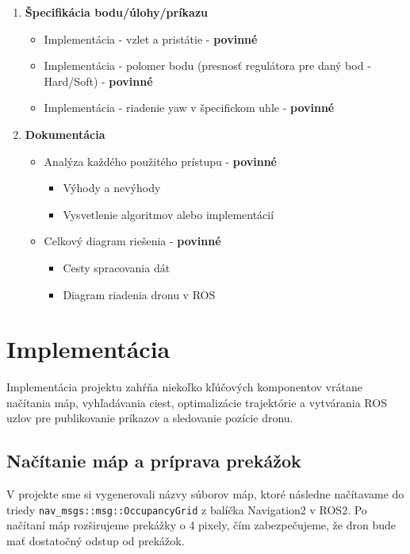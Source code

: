 \begin{enumerate}
    \item \textbf{Špecifikácia bodu/úlohy/príkazu}
    \begin{itemize}
        \item Implementácia - vzlet a pristátie - \textbf{povinné}
        \item Implementácia - polomer bodu (presnosť regulátora pre daný bod - Hard/Soft) - \textbf{povinné}
        \item Implementácia - riadenie yaw v špecifickom uhle - \textbf{povinné}
    \end{itemize}
    
    \item \textbf{Dokumentácia}
    \begin{itemize}
        \item Analýza každého použitého prístupu - \textbf{povinné}
        \begin{itemize}
            \item Výhody a nevýhody
            \item Vysvetlenie algoritmov alebo implementácií
        \end{itemize}
        \item Celkový diagram riešenia - \textbf{povinné}
        \begin{itemize}
            \item Cesty spracovania dát
            \item Diagram riadenia dronu v ROS
        \end{itemize}
    \end{itemize}
\end{enumerate}

\section{Implementácia}
Implementácia projektu zahŕňa niekoľko kľúčových komponentov vrátane načítania máp, vyhľadávania ciest, optimalizácie trajektórie a vytvárania ROS uzlov pre publikovanie príkazov a sledovanie pozície dronu.

\subsection{Načítanie máp a príprava prekážok}
V projekte sme si vygenerovali názvy súborov máp, ktoré následne načítavame do triedy \texttt{nav\_msgs::msg::OccupancyGrid} z balíčka Navigation2 v ROS2. Po načítaní máp rozširujeme prekážky o 4 pixely, čím zabezpečujeme, že dron bude mať dostatočný odstup od prekážok. 

